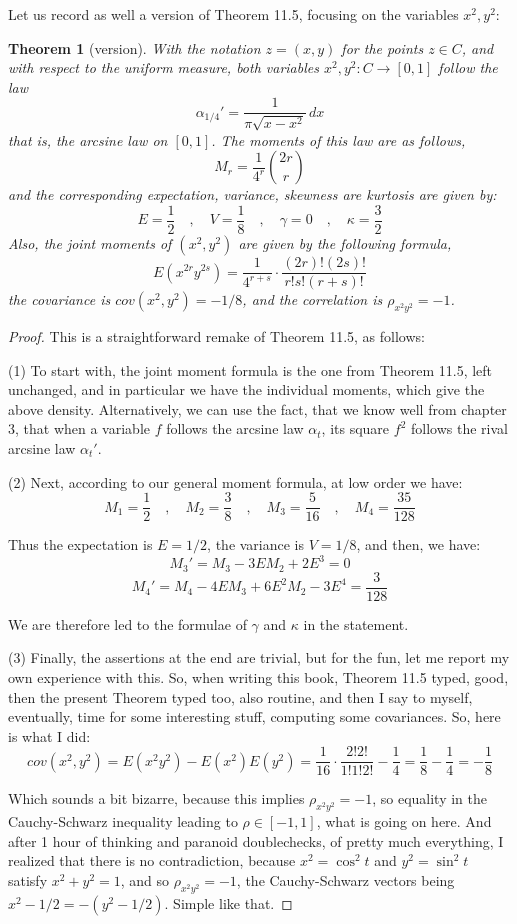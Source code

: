 \documentclass[12pt]{amsbook}
\newtheorem{theorem}{Theorem}[chapter]
\begin{document}
Let us record as well a version of Theorem 11.5, focusing on the variables $x^2,y^2$:

\begin{theorem}[version]
With the notation $z=(x,y)$ for the points $z\in C$, and with respect to the uniform measure, both variables $x^2,y^2:C\to[0,1]$ follow the law
$$\alpha_{1/4}'=\frac{1}{\pi\sqrt{x-x^2}}\,dx$$
that is, the arcsine law on $[0,1]$. The moments of this law are as follows,
$$M_r=\frac{1}{4^r}\binom{2r}{r}$$
and the corresponding expectation, variance, skewness are kurtosis are given by:
$$E=\frac{1}{2}\quad,\quad V=\frac{1}{8}\quad,\quad\gamma=0\quad,\quad\kappa=\frac{3}{2}$$
Also, the joint moments of $(x^2,y^2)$ are given by the following formula,
$$E(x^{2r}y^{2s})=\frac{1}{4^{r+s}}\cdot\frac{(2r)!(2s)!}{r!s!(r+s)!}$$
the covariance is $cov(x^2,y^2)=-1/8$, and the correlation is $\rho_{x^2y^2}=-1$.
\end{theorem}

\begin{proof}
This is a straightforward remake of Theorem 11.5, as follows:

\medskip

(1) To start with, the joint moment formula is the one from Theorem 11.5, left unchanged, and in particular we have the individual moments, which give the above density. Alternatively, we can use the fact, that we know well from chapter 3, that when a variable $f$ follows the arcsine law $\alpha_t$, its square $f^2$ follows the rival arcsine law $\alpha_t'$. 

\medskip

(2) Next, according to our general moment formula, at low order we have:
$$M_1=\frac{1}{2}\quad,\quad M_2=\frac{3}{8}\quad,\quad M_3=\frac{5}{16}\quad,\quad M_4=\frac{35}{128}$$

Thus the expectation is $E=1/2$, the variance is $V=1/8$, and then, we have:
$$M_3'=M_3-3EM_2+2E^3=0$$
$$M_4'=M_4-4EM_3+6E^2M_2-3E^4=\frac{3}{128}$$

We are therefore led to the formulae of $\gamma$ and $\kappa$ in the statement.

\medskip

(3) Finally, the assertions at the end are trivial, but for the fun, let me report my own experience with this. So, when writing this book, Theorem 11.5 typed, good, then the present Theorem typed too, also routine, and then I say to myself, eventually, time for some interesting stuff, computing some covariances. So, here is what I did:
$$cov(x^2,y^2)=E(x^2y^2)-E(x^2)E(y^2)=\frac{1}{16}\cdot\frac{2!2!}{1!1!2!}-\frac{1}{4}=\frac{1}{8}-\frac{1}{4}=-\frac{1}{8}$$

Which sounds a bit bizarre, because this implies $\rho_{x^2y^2}=-1$, so equality in the Cauchy-Schwarz inequality leading to $\rho\in[-1,1]$, what is going on here. And after 1 hour of thinking and paranoid doublechecks, of pretty much everything, I realized that there is no contradiction, because $x^2=\cos^2t$ and $y^2=\sin^2t$ satisfy $x^2+y^2=1$, and so $\rho_{x^2y^2}=-1$, the Cauchy-Schwarz vectors being $x^2-1/2=-(y^2-1/2)$. Simple like that.
\end{proof}
\end{document}
